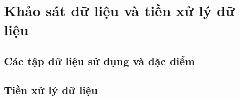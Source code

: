 \chapter{Khảo sát dữ liệu và tiền xử lý dữ liệu}
\section{Các tập dữ liệu sử dụng và đặc điểm}
\section{Tiền xử lý dữ liệu}


